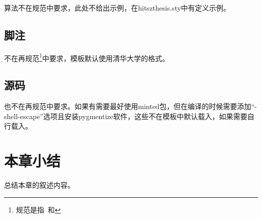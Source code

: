 算法不在规范中要求，此处不给出示例，在hitszthesis.sty中有定义示例。

\subsection{脚注}

不在再规范\footnote{规范是指\PGR\ 和\UGR}中要求，模板默认使用清华大学的格式。

\subsection{源码}

也不在再规范中要求。如果有需要最好使用minted包，但在编译的时候需要添加“-shell-escape”选项且安装pygmentize软件，这些不在模板中默认载入，如果需要自行载入。

\section{本章小结}

总结本章的叙述内容。

\lipsum[3]
